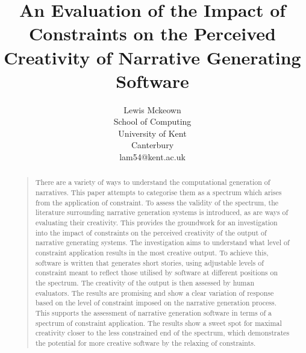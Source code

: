 \documentclass[letterpaper]{article}
\title{An Evaluation of the Impact of Constraints on the Perceived Creativity of Narrative Generating Software}
\author{Lewis Mckeown\\
School of Computing\\
University of Kent\\
Canterbury\\
lam54@kent.ac.uk\\ 
%
}
\begin{document}
 
\maketitle

\begin{abstract}
\begin{quote}
There are a variety of ways to understand the computational generation of narratives. This paper attempts to categorise them as a spectrum which arises from the application of constraint. To assess the validity of the spectrum, the literature surrounding narrative generation systems is introduced, as are ways of evaluating their creativity. This provides the groundwork for an investigation into the impact of constraints on the perceived creativity of the output of narrative generating systems. The investigation aims to understand what level of constraint application results in the most creative output. To achieve this, software is written that generates short stories, using adjustable levels of constraint meant to reflect those utilised by software at different positions on the spectrum. The creativity of the output is then assessed by human evaluators. The results are promising and show a clear variation of response based on the level of constraint imposed on the narrative generation process. This supports the assessment of narrative generation software in terms of a spectrum of constraint application. The results show a sweet spot for maximal creativity closer to the less constrained end of the spectrum, which demonstrates the potential for more creative software by the relaxing of constraints. \end{quote}
\end{abstract}

\end{document}
